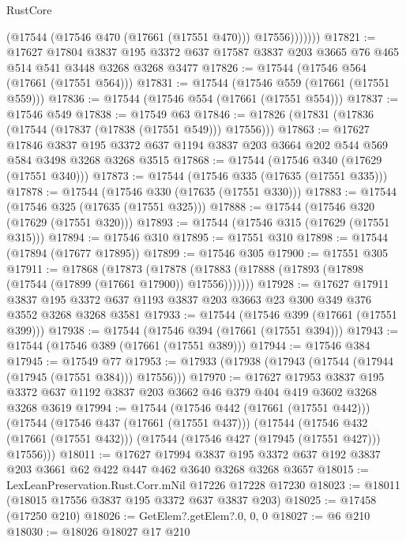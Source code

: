\begin{lexlean}{RustCore}
\begin{coremodule}
                (@17544 (@17546 @470 (@17661 (@17551 @470))) @17556)))))))
@17821 := @17627
    @17804
    @3837
    @195
    @3372
    @637
    @17587
    @3837
    @203
    @3665
    @76
    @465
    @514
    @541
    @3448
    @3268
    @3268
    @3477
@17826 := @17544 (@17546 @564 (@17661 (@17551 @564)))
@17831 := @17544 (@17546 @559 (@17661 (@17551 @559)))
@17836 := @17544 (@17546 @554 (@17661 (@17551 @554)))
@17837 := @17546 @549
@17838 := @17549 @63
@17846 := @17826 (@17831 (@17836 (@17544 (@17837 (@17838 (@17551 @549))) @17556)))
@17863 := @17627
    @17846
    @3837
    @195
    @3372
    @637
    @1194
    @3837
    @203
    @3664
    @202
    @544
    @569
    @584
    @3498
    @3268
    @3268
    @3515
@17868 := @17544 (@17546 @340 (@17629 (@17551 @340)))
@17873 := @17544 (@17546 @335 (@17635 (@17551 @335)))
@17878 := @17544 (@17546 @330 (@17635 (@17551 @330)))
@17883 := @17544 (@17546 @325 (@17635 (@17551 @325)))
@17888 := @17544 (@17546 @320 (@17629 (@17551 @320)))
@17893 := @17544 (@17546 @315 (@17629 (@17551 @315)))
@17894 := @17546 @310
@17895 := @17551 @310
@17898 := @17544 (@17894 (@17677 @17895))
@17899 := @17546 @305
@17900 := @17551 @305
@17911 := @17868
    (@17873 (@17878 (@17883 (@17888 (@17893 (@17898 (@17544 (@17899 (@17661 @17900)) @17556)))))))
@17928 := @17627
    @17911
    @3837
    @195
    @3372
    @637
    @1193
    @3837
    @203
    @3663
    @23
    @300
    @349
    @376
    @3552
    @3268
    @3268
    @3581
@17933 := @17544 (@17546 @399 (@17661 (@17551 @399)))
@17938 := @17544 (@17546 @394 (@17661 (@17551 @394)))
@17943 := @17544 (@17546 @389 (@17661 (@17551 @389)))
@17944 := @17546 @384
@17945 := @17549 @77
@17953 := @17933 (@17938 (@17943 (@17544 (@17944 (@17945 (@17551 @384))) @17556)))
@17970 := @17627
    @17953
    @3837
    @195
    @3372
    @637
    @1192
    @3837
    @203
    @3662
    @46
    @379
    @404
    @419
    @3602
    @3268
    @3268
    @3619
@17994 := @17544
    (@17546 @442 (@17661 (@17551 @442)))
    (@17544
      (@17546 @437 (@17661 (@17551 @437)))
      (@17544
        (@17546 @432 (@17661 (@17551 @432)))
        (@17544 (@17546 @427 (@17945 (@17551 @427))) @17556)))
@18011 := @17627
    @17994
    @3837
    @195
    @3372
    @637
    @192
    @3837
    @203
    @3661
    @62
    @422
    @447
    @462
    @3640
    @3268
    @3268
    @3657
@18015 := LexLeanPreservation.Rust.Corr.mNil @17226 @17228 @17230
@18023 := @18011 (@18015 @17556 @3837 @195 @3372 @637 @3837 @203)
@18025 := @17458 (@17250 @210)
@18026 := GetElem?.getElem?.{0, 0, 0}
@18027 := @6 @210
@18030 := @18026 @18027 @17 @210

\end{coremodule}
\end{lexlean}
